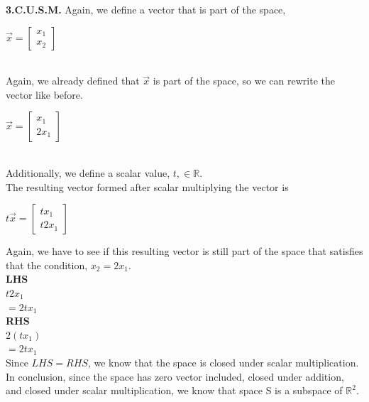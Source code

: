\documentclass[12pt]{article}
\newcommand{\R}{\mathbb{R}}
\begin{document}
\noindent
\textbf{3.C.U.S.M.}
Again, we define a vector that is part of the space, 
\begin{centering}
$\vec{x} = \begin{bmatrix}x_1\\x_2\end{bmatrix}$
\end{centering}\\
Again, we already defined that $\vec{x}$ is part of the space, so we can rewrite the vector like before.\\
\begin{centering}
$\vec{x} = \begin{bmatrix}x_1\\2x_1\end{bmatrix}$
\end{centering}\\
Additionally, we define a scalar value, $t, \in \R$.\\
The resulting vector formed after scalar multiplying the vector is\\
\begin{centering}
$t\vec{x} = \begin{bmatrix}tx_1\\t2x_1\end{bmatrix}$\\
\end{centering}
Again, we have to see if this resulting vector is still part of the space that satisfies that the condition, $x_2=2x_1$.\\
\textbf{LHS}\\
$t2x_1$\\
$=2tx_1$\\
\textbf{RHS}\\
$2(tx_1)$\\
$=2tx_1$\\
Since $LHS = RHS$, we know that the space is closed under scalar multiplication. \\
In conclusion, since the space has zero vector included, closed under addition, and closed under scalar multiplication, we know that space S is a subspace of $\R^2$.
\end{document}
